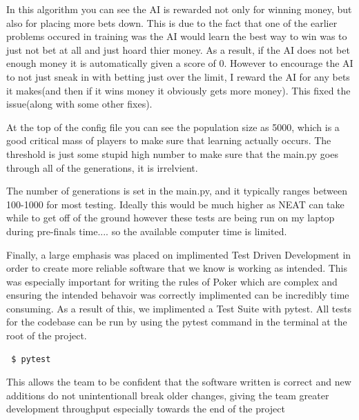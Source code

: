 In this algorithm you can see the AI is rewarded not only for winning money, but also for placing more bets
down. This is due to the fact that one of the earlier problems occured in training was the AI would learn the
best way to win was to just not bet at all and just hoard thier money. As a result, if the AI does not bet
enough money it is automatically given a score of 0. However to encourage the AI to not just sneak in with betting just over the limit, I reward the AI for any bets it makes(and then if it wins money it obviously gets more
money). This fixed the issue(along with some other fixes).

At the top of the config file you can see the population size as 5000, which is a good critical mass of players
to make sure that learning actually occurs. The threshold is just some stupid high number to make sure that the
main.py goes through all of the generations, it is irrelvient.

The number of generations is set in the main.py, and it typically ranges between 100-1000 for most testing.
Ideally this would be much higher as NEAT can take while to get off of the ground however these tests are being
run on my laptop during pre-finals time.... so the available computer time is limited.

Finally, a large emphasis was placed on implimented Test Driven Development in order
to create more reliable software that we know is working as intended. This was especially important for writing
the rules of Poker which are complex and ensuring the intended behavoir was correctly implimented can be
incredibly time consuming. As a result of this, we implimented a Test Suite with pytest. All tests for the
codebase can be run by using the pytest command in the terminal at the root of the project.
\begin{verbatim}
 $ pytest
\end{verbatim}

This allows the team to be confident that the software written is correct and new additions do not
unintentionall break older changes, giving the team greater development throughput especially towards the end
of the project

